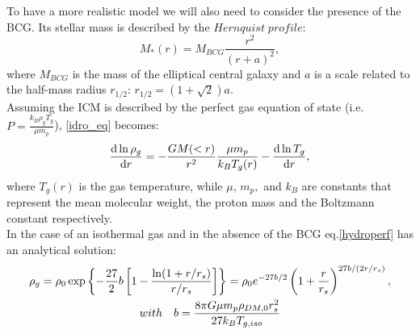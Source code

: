 \documentclass{article}
\begin{document}
To have a more realistic model we will also need to consider the presence of the BCG. Its stellar mass is described by the $Hernquist\; profile$:
\begin{equation}\label{Hern}
	M_{*}(r)=M_{BCG}\frac{r^{2}}{(r+a)^{2}},
\end{equation}
where $M_{BCG}$ is the mass of the elliptical central galaxy and $a$ is a scale related to the half-mass radius $r_{1/2}$: $r_{1/2}=(1+\sqrt{2})a$.\\
Assuming the ICM is described by the perfect gas equation of state (i.e. $P=\frac{k_{B}\rho_{g}T_{g}}{\mu m_{p}}$), \eqref{idro_eq} becomes:
\begin{equation}\label{hydroperf}
	\derivative{\ln \rho_{g}}{r}=-\frac{GM(<r)}{r^{2}}\frac{\mu m_{p}}{k_{B}T_{g}(r)}-\derivative{\ln T_{g}}{r},
\end{equation}
where $T_{g}(r)$ is the gas temperature, while $\mu ,\, m_{p},$ and $k_{B}$ are constants that represent the mean molecular weight, the proton mass and the Boltzmann constant respectively.\\
In the case of an isothermal gas and in the absence of the BCG eq.\eqref{hydroperf} has an analytical solution:
	\begin{gather}
		\rho_{g}=\rho_{0}\exp\left\{-\frac{27}{2}b\left[1-\frac{\ln (1+r/r_{s})}{r/r_{s}}\right]\right\}=\rho_{0}e^{-27b/2}\left(1+\frac{r}{r_{s}}\right)^{27b/(2r/r_{s})},\\
	with \quad b=\frac{8\pi G\mu m_{p}\rho_{DM,0}r_{s}^{2}}{27k_{B}T_{g,iso}}\notag
	\end{gather}
\end{document}
